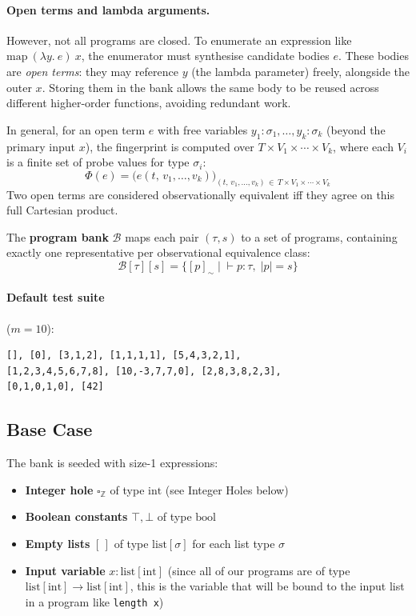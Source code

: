 \documentclass[11pt,a4paper]{article}
\begin{document}
\paragraph{Open terms and lambda arguments.}
However, not all programs are closed. To enumerate an expression like
$\mathrm{map}\ (\lambda y.\ e)\ x$, the enumerator must synthesise candidate bodies $e$.
These bodies are \emph{open terms}: they may reference $y$ (the lambda parameter) freely,
alongside the outer $x$. Storing them in the bank allows the same body to be reused
across different higher-order functions, avoiding redundant work.

In general, for an open term $e$ with free variables
$y_1 : \sigma_1, \ldots, y_k : \sigma_k$ (beyond the primary input $x$), the fingerprint
is computed over $T \times V_1 \times \cdots \times V_k$, where each $V_i$ is a finite
set of probe values for type $\sigma_i$:
\[
  \Phi(e)
    = \bigl(e(t,\, v_1,\ldots,v_k)\bigr)_{(t,\, v_1,\ldots,v_k)
        \,\in\, T \times V_1 \times \cdots \times V_k}
\]
Two open terms are considered observationally equivalent iff they agree on this full
Cartesian product.

The \textbf{program bank} $\mathcal{B}$ maps each pair $(\tau, s)$ to a set of programs,
containing exactly one representative per observational equivalence class:
\[
  \mathcal{B}[\tau][s]
    = \bigl\{[p]_\sim \;\big|\; \vdash p : \tau,\; \lvert p \rvert = s\bigr\}
\]

\paragraph{Default test suite} ($m = 10$):
\begin{lstlisting}
[], [0], [3,1,2], [1,1,1,1], [5,4,3,2,1],
[1,2,3,4,5,6,7,8], [10,-3,7,7,0], [2,8,3,8,2,3],
[0,1,0,1,0], [42]
\end{lstlisting}

\subsection{Base Case}\label{sec:base}

The bank is seeded with size-1 expressions:
\begin{itemize}
  \item \textbf{Integer hole} $\square_{\mathbb{Z}}$ of type $\mathrm{int}$ (see Integer Holes below)
  \item \textbf{Boolean constants} $\top, \bot$ of type $\mathrm{bool}$
  \item \textbf{Empty lists} $[\,]$ of type $\mathrm{list}[\sigma]$ for each list type $\sigma$
  \item \textbf{Input variable} $x : \mathrm{list}[\mathrm{int}]$ (since all of our
        programs are of type $\mathrm{list}[\mathrm{int}] \to \mathrm{list}[\mathrm{int}]$,
        this is the variable that will be bound to the input list in a program like
        \texttt{length x})
\end{itemize}
\end{document}
